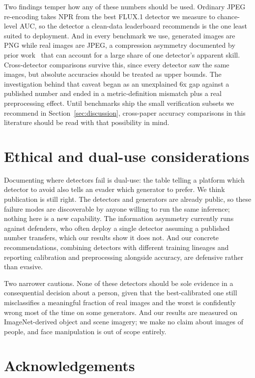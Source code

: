 \documentclass[3p,times,procedia]{elsarticle}
\begin{document}
Two findings temper how any of these numbers should be used. Ordinary JPEG
re-encoding takes NPR from the best FLUX.1 detector we measure to
chance-level AUC, so the detector a clean-data leaderboard recommends is
the one least suited to deployment. And in every benchmark we use,
generated images are PNG while real images are JPEG, a compression
asymmetry documented by prior work~\cite{grommelt2024jpeg} that can account
for a large share of one detector's apparent skill. Cross-detector
comparisons survive this, since every detector saw the same images, but
absolute accuracies should be treated as upper bounds. The investigation
behind that caveat began as an unexplained 6x gap against a published
number and ended in a metric-definition mismatch plus a real preprocessing
effect. Until benchmarks ship the small verification subsets we recommend
in Section~\ref{sec:discussion}, cross-paper accuracy comparisons in this
literature should be read with that possibility in mind.

\section{Ethical and dual-use considerations}
\label{sec:ethics}

Documenting where detectors fail is dual-use: the table telling a platform
which detector to avoid also tells an evader which generator to prefer. We
think publication is still right. The detectors and generators are already
public, so these failure modes are discoverable by anyone willing to run
the same inference; nothing here is a new capability. The information
asymmetry currently runs against defenders, who often deploy a single
detector assuming a published number transfers, which our results show it
does not. And our concrete recommendations, combining detectors with
different training lineages and reporting calibration and preprocessing
alongside accuracy, are defensive rather than evasive.

Two narrower cautions. None of these detectors should be sole evidence in a
consequential decision about a person, given that the best-calibrated one
still misclassifies a meaningful fraction of real images and the worst is
confidently wrong most of the time on some generators. And our results are
measured on ImageNet-derived object and scene imagery; we make no claim
about images of people, and face manipulation is out of scope entirely.

\section*{Acknowledgements}
\end{document}
